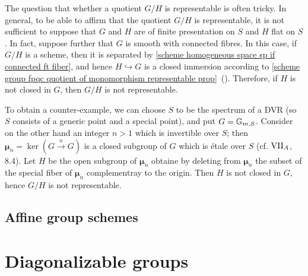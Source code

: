 \begin{remark}
The question that whether a quotient $G/H$ is representable is often tricky. In general, to be able to affirm that the quotient $G/H$ is representable, it is not sufficient to suppose that $G$ and $H$ are of finite presentation on $S$ and $H$ flat on $S$. In fact, suppose further that $G$ is smooth with connected fibres. In this case, if $G/H$ is a scheme, then it is separated by \cref{scheme homogeneous space sp if connected ft fiber}, and hence $H\hookrightarrow G$ is a closed immersion according to \cref{scheme group fpqc quotient of monomorphism representable prop}~(). Therefore, if $H$ is not closed in $G$, then $G/H$ is not representable.\par
To obtain a counter-example, we can choose $S$ to be the spectrum of a DVR (so $S$ consists of a generic point and a special point), and put $G=\mathbb{G}_{m,S}$. Consider on the other hand an integer $n>1$ which is invertible over $S$; then $\bm{\mu}_n=\ker(G\stackrel{n}{\to}G)$ is a closed subgroup of $G$ which is \'etale over $S$ (cf. \cite{SGA3-1} $\Rmnum{7}_A$, 8.4). Let $H$ be the open subgroup of $\bm{\mu}_n$ obtaine by deleting from $\bm{\mu}_n$ the subset of the special fiber of $\bm{\mu}_n$ complementray to the origin. Then $H$ is not closed in $G$, hence $G/H$ is not representable.
\end{remark}

\subsection{Affine group schemes}

\section{Diagonalizable groups}
